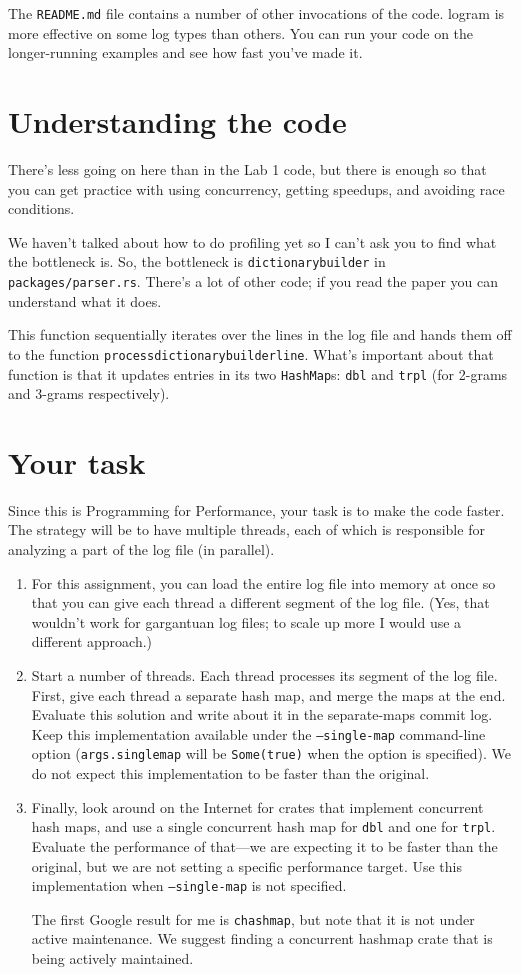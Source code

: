 \documentclass[12pt]{article}
\renewcommand{\_}{\kern-1.5pt\textunderscore\kern-1.5pt}
\begin{document}
The \texttt{README.md} file contains a number of other invocations of the code. logram is more effective on some log types than others. You can run your code on the longer-running examples and see how fast you've made it.

\section*{Understanding the code}
There's less going on here than in the Lab 1 code, but there is enough so that you can get practice with using concurrency, getting speedups, and avoiding race conditions.

We haven't talked about how to do profiling yet so I can't ask you to find what the bottleneck is. So, the bottleneck is \texttt{dictionary\_builder} in \texttt{packages/parser.rs}. There's a lot of other code; if you read the paper you can understand what it does.

This function sequentially iterates over the lines in the log file and hands them off to the function \texttt{process\_dictionary\_builder\_line}. What's important about that function is that it updates entries in its two \texttt{HashMap}s: \texttt{dbl} and \texttt{trpl} (for 2-grams and 3-grams respectively).

\section*{Your task}
Since this is Programming for Performance, your task is to make the code faster. The strategy will be to have multiple threads, each of which is responsible for analyzing a part of the log file (in parallel).
\begin{enumerate}
\item For this assignment, you can load the entire log file into memory at once so that you can give each thread a different segment of the log file. (Yes, that wouldn't work for gargantuan log files; to scale up more I would use a different approach.)
\item Start a number of threads. Each thread processes its segment of the log file. First, give each thread a separate hash map, and merge the maps at the end. Evaluate this solution and write about it in the separate-maps commit log. Keep this implementation available under the \texttt{--single-map} command-line option (\texttt{args.single\_map} will be \texttt{Some(true)} when the option is specified). We do not expect this implementation to be faster than the original.
\item Finally, look around on the Internet for crates that implement concurrent hash maps, and use a single concurrent hash map for \texttt{dbl} and one for \texttt{trpl}. Evaluate the performance of that---we are expecting it to be faster than the original, but we are not setting a specific performance target. Use this implementation when \texttt{--single-map} is not specified.

  The first Google result for me is \texttt{chashmap}, but note that it is not under active maintenance. We suggest finding a concurrent hashmap crate that is being actively maintained.
\end{enumerate}
\end{document}
